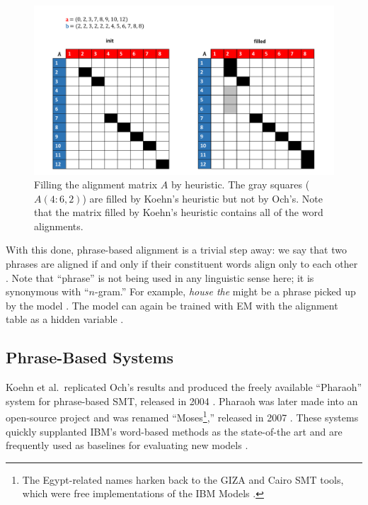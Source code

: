 \documentclass[11pt]{article}
\begin{document}
\begin{figure}
\centering
\includegraphics[scale=0.5]{heuristic.pdf}
\caption{Filling the alignment matrix $A$ by heuristic. The gray squares ($A(4:6,2)$) are filled by Koehn's heuristic but not by
Och's. Note that the matrix filled by Koehn's heuristic contains all of the word alignments.}
\label{heuristic}
\end{figure}

With this done, phrase-based alignment is a trivial step away: we say that two phrases are aligned
if and only if their constituent words align only to each other \cite{och:99}.
Note that ``phrase'' is not being used in any linguistic sense here; it is synonymous with ``$n$-gram.''
For example, \textit{house the} might be a phrase picked up by the model \cite{chiang:05}.
The model can again be trained with EM with the alignment table as a hidden variable \cite{och:99}.



\subsection{Phrase-Based Systems}
Koehn et al.\ replicated Och's results and produced the freely available
``Pharaoh'' system for phrase-based SMT, released in 2004 \cite{koehn:03, pharaoh}.
Pharaoh was later made into an open-source project and was renamed ``Moses\footnote{The 
Egypt-related names harken back to the GIZA and Cairo SMT tools, which were free implementations
of the IBM Models \cite{giza, cairo}.},'' released in 2007 \cite{moses}.
These systems quickly supplanted IBM's word-based methods as
the state-of-the art and are frequently used as baselines for evaluating new models \cite{lopez, chiang:05}.
\end{document}
